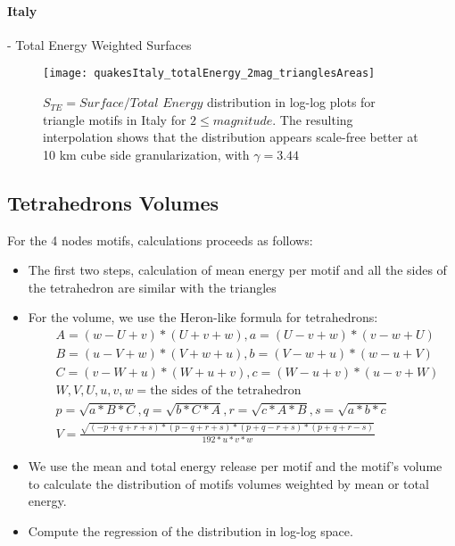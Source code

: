 \paragraph{Italy} - Total Energy Weighted Surfaces
\begin{figure}[h!]

  \centering
  \texttt{[image: quakesItaly\_totalEnergy\_2mag\_trianglesAreas]}
  \label{fig:trianglesItTE2}


\caption{$S_{TE} = Surface/Total$ $Energy$ distribution in log-log plots for triangle motifs in Italy for $2 \leq magnitude$. The resulting interpolation shows that the distribution appears scale-free better at 10 km cube side granularization, with $\gamma = 3.44$}
\label{fig:trianglesSurfacesItTE}
\end{figure}

\clearpage
\subsection{Tetrahedrons Volumes}
For the 4 nodes motifs, calculations proceeds as follows:
\begin{itemize}

	\item The first two steps, calculation of mean energy per motif and all the sides of the tetrahedron are similar with the triangles
	
	\item For the volume, we use the Heron-like formula \cite{tetrahedron} for tetrahedrons:
	\begin{equation}
	\begin{split}
	&A = (w-U+v)*(U+v+w),a = (U-v+w)*(v-w+U)\\
    &B = (u-V+w)*(V+w+u),b = (V-w+u)*(w-u+V)\\
    &C = (v-W+u)*(W+u+v),c = (W-u+v)*(u-v+W)\\
    &W,V,U,u,v,w = \text{the sides of the tetrahedron}\\
    &p=\sqrt{a*B*C},q=\sqrt{b*C*A},r=\sqrt{c*A*B},s=\sqrt{a*b*c}\\
    &V=\frac{\sqrt{(-p+q+r+s)*(p-q+r+s)*(p+q-r+s)*(p+q+r-s)}}{192*u*v*w}
	\end{split}
	\end{equation}
	
	\item We use the mean and total energy release per motif and the motif's volume to calculate the distribution of motifs volumes weighted by mean or total energy.
	
	\item Compute the regression of the distribution in log-log space.
\end{itemize}

